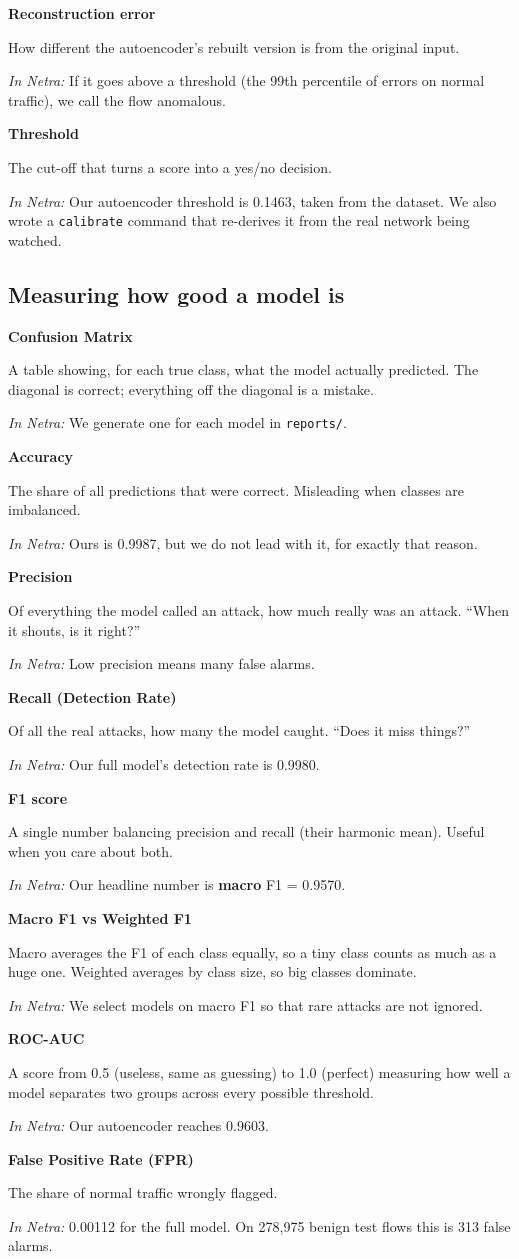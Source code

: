 \documentclass[11pt,a4paper]{article}
\newcommand{\term}[3]{%
  \par\medskip\noindent\textbf{\color{ink}#1}\par
  \nobreak\vspace{1pt}#2\par
  \nobreak\vspace{1pt}\textit{\color{accent}In Netra:} #3\par}
\begin{document}
\term{Reconstruction error}
{How different the autoencoder's rebuilt version is from the original input.}
{If it goes above a threshold (the 99th percentile of errors on normal traffic),
we call the flow anomalous.}

\term{Threshold}
{The cut-off that turns a score into a yes/no decision.}
{Our autoencoder threshold is 0.1463, taken from the dataset. We also wrote a
\texttt{calibrate} command that re-derives it from the real network being watched.}

\subsection{Measuring how good a model is}

\term{Confusion Matrix}
{A table showing, for each true class, what the model actually predicted. The
diagonal is correct; everything off the diagonal is a mistake.}
{We generate one for each model in \texttt{reports/}.}

\term{Accuracy}
{The share of all predictions that were correct. Misleading when classes are
imbalanced.}
{Ours is 0.9987, but we do not lead with it, for exactly that reason.}

\term{Precision}
{Of everything the model called an attack, how much really was an attack.
``When it shouts, is it right?''}
{Low precision means many false alarms.}

\term{Recall (Detection Rate)}
{Of all the real attacks, how many the model caught. ``Does it miss things?''}
{Our full model's detection rate is 0.9980.}

\term{F1 score}
{A single number balancing precision and recall (their harmonic mean). Useful when
you care about both.}
{Our headline number is \textbf{macro} F1 = 0.9570.}

\term{Macro F1 vs Weighted F1}
{Macro averages the F1 of each class equally, so a tiny class counts as much as a
huge one. Weighted averages by class size, so big classes dominate.}
{We select models on macro F1 so that rare attacks are not ignored.}

\term{ROC-AUC}
{A score from 0.5 (useless, same as guessing) to 1.0 (perfect) measuring how well
a model separates two groups across every possible threshold.}
{Our autoencoder reaches 0.9603.}

\term{False Positive Rate (FPR)}
{The share of normal traffic wrongly flagged.}
{0.00112 for the full model. On 278,975 benign test flows this is 313 false
alarms.}
\end{document}
